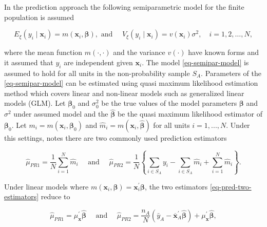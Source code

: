 \documentclass[
]{jss}
\begin{document}
In the prediction approach the following semiparametric model for the
finite population is assumed

\begin{equation}
E_{\xi}\left(y_i \mid \boldsymbol{x}_i\right)=m\left(\boldsymbol{x}_i, \boldsymbol{\beta}\right), \text { and } \quad V_{\xi}\left(y_i \mid \boldsymbol{x}_i\right)=v\left(\boldsymbol{x}_i\right) \sigma^2, \quad i=1,2, \ldots, N,
\label{eq-semipar-model}
\end{equation}

where the mean function \(m(\cdot,\cdot)\) and the variance \(v(\cdot)\)
have known forms and it assumed that \(y_i\) are independent given
\(\boldsymbol{x}_i\). The model \eqref{eq-semipar-model} is assumed to
hold for all units in the non-probability sample \(S_A\). Parameters of
the \eqref{eq-semipar-model} can be estimated using quasi maximum
likelihood estimation method which covers linear and non-linear models
such as generalized linear models (GLM). Let \(\boldsymbol{\beta}_0\)
and \(\sigma^2_0\) be the true values of the model parameters
\(\boldsymbol{\beta}\) and \(\sigma^2\) under assumed model and the
\(\hat{\boldsymbol{\beta}}\) be the quasi maximum likelihood estimator
of \(\boldsymbol{\beta}_0\). Let
\(m_i=m(\boldsymbol{x}_i, \boldsymbol{\beta}_0)\) and
\(\hat{m}_i=m(\boldsymbol{x}_i, \hat{\boldsymbol{\beta}})\) for all
units \(i=1,...,N\). Under this settings, \citet{wu2022statistical}
notes there are two commonly used prediction estimators

\begin{equation}
\hat{\mu}_{PR1}=\frac{1}{N} \sum_{i=1}^N \hat{m}_i \quad \text { and } \quad \hat{\mu}_{PR2}=\frac{1}{N}\left\{\sum_{i \in S_A} y_i-\sum_{i \in S_A} \hat{m}_i+\sum_{i=1}^N \hat{m}_i\right\}.
\label{eq-pred-two-estimators}
\end{equation}

Under linear models where
\(m(\boldsymbol{x}_i, \boldsymbol{\beta})=\boldsymbol{x}_i^{\prime}\boldsymbol{\beta}\),
the two estimators \eqref{eq-pred-two-estimators} reduce to

\begin{equation}
\hat{\mu}_{PR1}=\mu_{\boldsymbol{x}}^{\prime} \hat{\boldsymbol{\beta}} \quad \text { and } \quad \hat{\mu}_{PR2}=\frac{n_A}{N}\left(\bar{y}_A-\overline{\boldsymbol{x}}_A^{\prime} \hat{\boldsymbol{\beta}}\right)+\mu_{\boldsymbol{x}}^{\prime} \hat{\boldsymbol{\beta}},
\label{eq-pred-two-estimators-simplified}
\end{equation}
\end{document}
